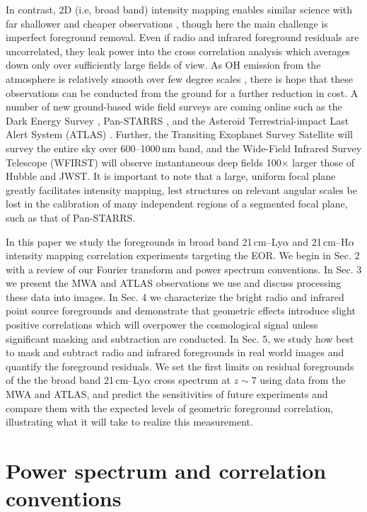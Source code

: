 \documentclass[numberedappendix]{emulateapj}
\begin{document}
In contrast, 2D (i.e, broad band) intensity mapping enables similar science with far shallower and cheaper observations \citep{StarsAndReionization,mao14}, though here the main challenge is imperfect foreground removal. Even if radio and infrared foreground residuals are uncorrelated, they leak power into the cross correlation analysis which averages down only over sufficiently large fields of view. As OH emission from the atmosphere is relatively smooth over few degree scales \citep{high10}, there is hope that these observations can be conducted from the ground for a further reduction in cost. A number of new ground-based wide field surveys are coming online such as the Dark Energy Survey \citep{des16}, Pan-STARRS \citep{tonry12}, and the Asteroid Terrestrial-impact Last Alert System (ATLAS) \citep{tonry11}. Further, the Transiting Exoplanet Survey Satellite \citep{ricker14} will survey the entire sky over 600--1000\,nm band, and the Wide-Field Infrared Survey Telescope (WFIRST) \citep{Spergel2013} will observe instantaneous deep fields 100$\times$ larger those of Hubble and JWST. It is important to note that a large, uniform focal plane greatly facilitates intensity mapping, lest structures on relevant angular scales be lost in the calibration of many independent regions of a segmented focal plane, such as that of Pan-STARRS. 

In this paper we study the foregrounds in broad band 21\,cm--Ly$\alpha$ and 21\,cm--H$\alpha$ intensity mapping correlation experiments targeting the EOR. We begin in Sec. 2 with a review of our Fourier transform and power spectrum conventions.
  In Sec. 3 we present the MWA and ATLAS observations we use and discuss processing these data into images. 
   In Sec. 4 we characterize the bright radio and infrared point source foregrounds and 
   demonstrate that geometric effects introduce slight positive correlations which will overpower the cosmological signal
   unless significant masking and subtraction are conducted. 
   In Sec. 5, we study how best to mask and subtract radio and infrared foregrounds in real world images and 
   quantify the foreground residuals. We set the first limits 
   on residual foregrounds of the the broad band 21\,cm--Ly$\alpha$ cross spectrum at $z\sim7$ using data from the MWA
     and ATLAS, and predict the sensitivities of future experiments and compare them with the expected levels of geometric foreground correlation, 
     illustrating what it will take to realize this measurement.

\section{Power spectrum and correlation conventions}
\label{sec:pspecconventions}
\end{document}
